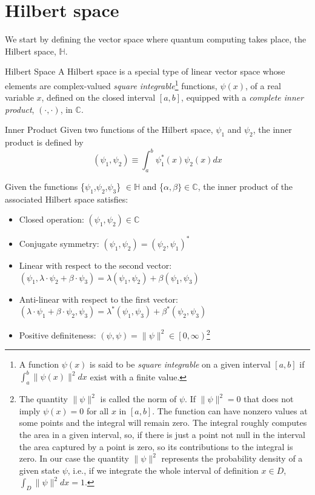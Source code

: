 \section{Hilbert space}
We start by defining the vector space where quantum computing takes place, the Hilbert space, $\mathbb{H}$.
\begin{definition}{Hilbert Space}{}
A Hilbert space is a special type of linear vector space whose elements are complex-valued \textit{square integrable}\footnote{A function $\psi(x)$ is said to be \textit{square integrable} on a given interval $\left[a, b\right]$ if $\int_{a}^{b}\|\psi(x)\|^{2}dx$ exist with a finite value.} functions, $\psi(x)$, of a real variable $x$, defined on the closed interval $\left[a, b\right]$, equipped with a \textit{complete inner product}, $(\cdot,\cdot)$, in $\mathbb{C}$.
\end{definition}
\begin{definition}{Inner Product}{}
Given two functions of the Hilbert space, $\psi_{1}$ and $\psi_{2}$, the inner product is defined by
\begin{equation}
    \left(\psi_{1}, \psi_{2}\right) \equiv \int^{b}_{a} \psi_{1}^{*}(x)\psi_{2}(x)dx
\end{equation}
\end{definition}
\begin{corollary}{}{}
 Given the functions \{$\psi_{1}$,$\psi_{2}$,$\psi_{3}$\} $\in \mathbb{H}$ and \{$\alpha, \beta\} \in \mathbb{C}$, the inner product of the associated Hilbert space satisfies:
\begin{itemize}
    \item Closed operation: $(\psi_{1},\psi_{2})\in \mathbb{C}$
    \item Conjugate symmetry: $(\psi_{1},\psi_{2}) = (\psi_{2},\psi_{1})^{*}$
    \item Linear with respect to the second vector: $(\psi_{1},\lambda \cdot \psi_{2} + \beta\cdot\psi_{3}) = \lambda(\psi_{1},\psi_{2}) + \beta(\psi_{1},\psi_{3})$
    \item Anti-linear with respect to the first vector: $(\lambda \cdot \psi_{1} + \beta \cdot \psi_{2}, \psi_{3}) = \lambda^{*}(\psi_{1},\psi_{3}) + \beta^{*} (\psi_{2},\psi_{3})$
    \item Positive definiteness: $(\psi, \psi) = \lVert \psi \rVert^{2} \in \left[0,\infty\right)$\footnote{The quantity $\lVert \psi \rVert^{2}$ is called the norm of $\psi$. If $\lVert \psi \rVert^{2} = 0$ that does not imply $\psi(x) = 0$ for all $x$ in $\left[a,b\right]$. The function can have nonzero values at some points and the integral will remain zero. The integral roughly computes the area in a given interval, so, if there is just a point not null in the interval the area captured by a point is zero, so its contributions to the integral is zero. In our case the quantity $\lVert \psi \rVert^{2}$ represents the probability density of a given state $\psi$, i.e., if we integrate the whole interval of definition $x \in D$, $\int_{D}\lVert \psi \rVert^{2}dx = 1$.} 
\end{itemize}    
\end{corollary}
